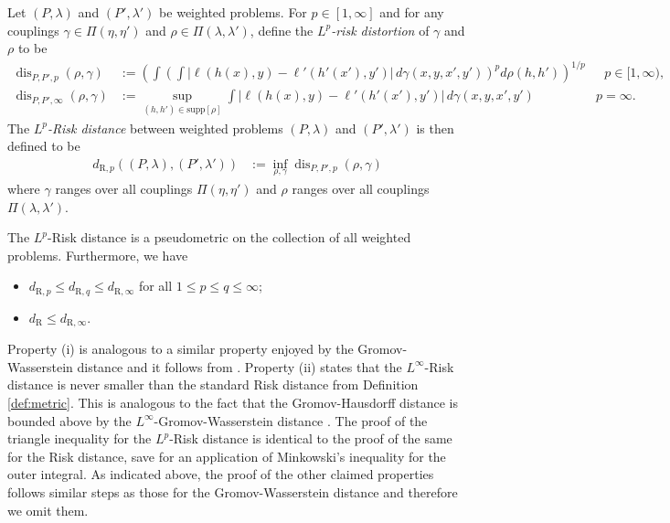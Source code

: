\documentclass[twoside,11pt]{article}
\newcommand{\dexp}[1][]{d_{\mathrm{R}#1}}
\DeclareMathOperator{\dis}{dis}
\newcommand{\supp}{\mathrm{supp}}
\begin{document}
\begin{definition}
    Let $(P,\lambda)$ and $(P',\lambda')$ be weighted problems. For $p\in[1,\infty]$ and  
    for any couplings $\gamma \in \Pi(\eta,\eta')$ and $\rho \in \Pi(\lambda,\lambda')$, define the \emph{$L^p$-risk distortion} of $\gamma$ and $\rho$ to be
    \begin{align*}
         \dis_{P,P',p}(\rho,\gamma) &:= \left(\int \left(\int \big|\ell(h(x),y) - \ell'(h'(x'),y')\big| \, d\gamma(x,y, x',y') \right)^{p}d\rho(h,h')\right)^{1/p}&\mbox{ $p\in[1,\infty)$,}\\
         \dis_{P,P',\infty}(\rho,\gamma) &:= \sup_{(h,h')\in\supp[\rho]} \int \big|\ell(h(x),y) - \ell'(h'(x'),y')\big| \, d\gamma(x,y, x',y')  & \mbox{$p=\infty$.}
    \end{align*}
       The \emph{$L^p$-Risk distance} between weighted problems $(P,\lambda)$ and $(P',\lambda')$ is then defined to be
    \begin{align*}
        \dexp[,p]((P,\lambda),(P',\lambda')) & := \inf_{\rho, \gamma} \dis_{P,P',p}(\rho,\gamma)
    \end{align*}
    where $\gamma$ ranges over all couplings $\Pi(\eta,\eta')$ and $\rho$ ranges over all couplings $\Pi(\lambda,\lambda')$.
    
\end{definition}
\begin{theorem}
The $L^p$-Risk distance is a pseudometric on the collection of all weighted problems. Furthermore, we have 
\begin{itemize}
    \item[(i)] $\dexp[,p]\leq \dexp[,q]\leq \dexp[,\infty]$ for all $1\leq p\leq q \leq \infty$;
    \item[(ii)] $\dexp\leq \dexp[,\infty]$.
\end{itemize}
\end{theorem}
\begin{remark} Property (i) is analogous to a similar property enjoyed by the Gromov-Wasserstein distance \citep[Theorem 5.1 (h)]{memoli_gromovwasserstein_2011} and it follows from \citep[Lemma 2.2]{memoli_gromovwasserstein_2011}. Property (ii) states that the $L^\infty$-Risk distance is never smaller than the standard Risk distance from Definition \ref{def:metric}. This is analogous to the fact that the Gromov-Hausdorff distance is bounded above by the $L^\infty$-Gromov-Wasserstein distance \citep[Theorem 5.1 (b)]{memoli_gromovwasserstein_2011}. The proof of the triangle inequality for the $L^p$-Risk distance is identical to the proof of the same for the Risk distance, save for an application of Minkowski's inequality for the outer integral. As indicated above, the proof of the other claimed properties follows similar steps as those for the Gromov-Wasserstein distance and therefore we omit them.
\end{remark}
\end{document}
